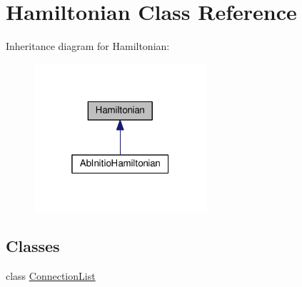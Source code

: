 \hypertarget{classHamiltonian}{}\section{Hamiltonian Class Reference}
\label{classHamiltonian}


Inheritance diagram for Hamiltonian\+:
\nopagebreak
\begin{figure}[H]
\begin{center}
\leavevmode
\includegraphics[width=181pt]{classHamiltonian__inherit__graph}
\end{center}
\end{figure}
\subsection*{Classes}
\begin{DoxyCompactItemize}
\item 
class \hyperlink{classHamiltonian_1_1ConnectionList}{Connection\+List}
\end{DoxyCompactItemize}
